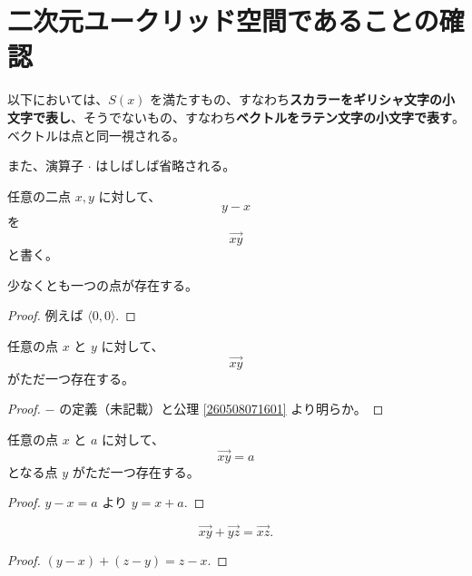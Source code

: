 \section{二次元ユークリッド空間であることの確認}

以下においては、\(S(x)\) を満たすもの、すなわち\textbf{スカラーをギリシャ文字の小文字で表し}、そうでないもの、すなわち\textbf{ベクトルをラテン文字の小文字で表す}。
ベクトルは点と同一視される。

また、演算子 \(\cdot\) はしばしば省略される。


\begin{dfn}
  任意の二点 \(x,y\) に対して、
  \[y-x\]
  を
  \[\overrightarrow{xy}\]
  と書く。
\end{dfn}


\begin{thm}
  少なくとも一つの点が存在する。
\end{thm}

\begin{proof}
  例えば \(\langle0,0\rangle.\)
\end{proof}


\begin{thm}
  任意の点 \(x\) と \(y\) に対して、
  \[\overrightarrow{xy}\]
  がただ一つ存在する。
\end{thm}

\begin{proof}
  \(-\) の定義（未記載）と公理 \ref{260508071601} より明らか。
\end{proof}


\begin{thm}\label{260527103901}
  任意の点 \(x\) と \(a\) に対して、
  \[\overrightarrow{xy}=a\]
  となる点 \(y\) がただ一つ存在する。
\end{thm}

\begin{proof}
  \(y-x=a\) より \(y=x+a.\)
\end{proof}


\begin{thm}
  \[\overrightarrow{xy}+\overrightarrow{yz}=\overrightarrow{xz}.\]
\end{thm}

\begin{proof}
  \((y-x)+(z-y)=z-x.\)
\end{proof}

